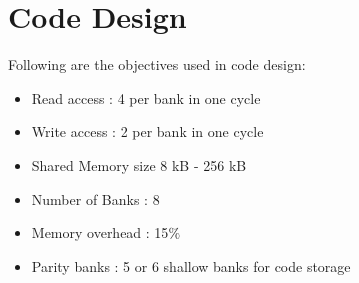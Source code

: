 \section{Code Design}

Following are the objectives used in code design:
\begin{itemize}
\item Read access : 4 per bank in one cycle
\item Write access : 2 per bank in one cycle
\item Shared Memory size 8 kB - 256 kB
\item Number of Banks : 8
\item Memory overhead : 15$ \% $
\item Parity banks : 5 or 6 shallow banks for code storage
\end{itemize}

